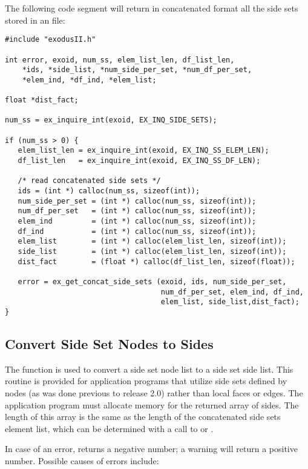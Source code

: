 The following code segment will return in concatenated format
all the side sets stored in an \exo{} file:

\begin{lstlisting}
#include "exodusII.h"

int error, exoid, num_ss, elem_list_len, df_list_len,
    *ids, *side_list, *num_side_per_set, *num_df_per_set,
    *elem_ind, *df_ind, *elem_list;

float *dist_fact;

num_ss = ex_inquire_int(exoid, EX_INQ_SIDE_SETS);

if (num_ss > 0) {
   elem_list_len = ex_inquire_int(exoid, EX_INQ_SS_ELEM_LEN);
   df_list_len   = ex_inquire_int(exoid, EX_INQ_SS_DF_LEN);

   /* read concatenated side sets */
   ids = (int *) calloc(num_ss, sizeof(int));
   num_side_per_set = (int *) calloc(num_ss, sizeof(int));
   num_df_per_set   = (int *) calloc(num_ss, sizeof(int));
   elem_ind         = (int *) calloc(num_ss, sizeof(int));
   df_ind           = (int *) calloc(num_ss, sizeof(int));
   elem_list        = (int *) calloc(elem_list_len, sizeof(int));
   side_list        = (int *) calloc(elem_list_len, sizeof(int));
   dist_fact        = (float *) calloc(df_list_len, sizeof(float));

   error = ex_get_concat_side_sets (exoid, ids, num_side_per_set,
                                    num_df_per_set, elem_ind, df_ind,
                                    elem_list, side_list,dist_fact);
}
\end{lstlisting}

\subsection{Convert Side Set Nodes to Sides}

The function  is used to convert a
side set node list to a side set side list. This routine is provided
for application programs that utilize side sets defined by nodes (as
was done previous to release 2.0) rather than local faces or
edges. The application program must allocate memory for the returned
array of sides. The length of this array is the same as the length of
the concatenated side sets element list, which can be determined with
a call to  or
.

In case of an error,  returns a
negative number; a warning will return a positive number. Possible
causes of errors include:

